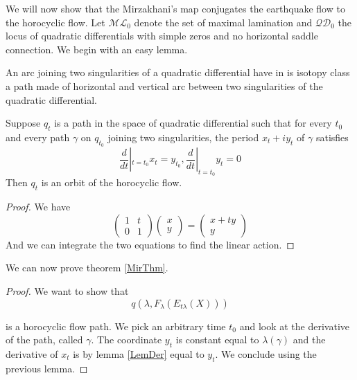 We will now show that the Mirzakhani's map conjugates the earthquake flow to the horocyclic flow. Let $\mathcal{ML}_0$ denote the set of maximal lamination and $\mathcal{QD}_0$ the locus of quadratic differentials with simple zeros and no horizontal saddle connection. We begin with an easy lemma.

\begin{lem}
An arc joining two singularities of a quadratic differential have in is isotopy class a path made of horizontal and vertical arc between two singularities of the quadratic differential.
\end{lem}

\begin{cor}
Suppose $q_t$ is a path in the space of quadratic differential such that for every $t_0$ and every path $\gamma$ on $q_{t_0}$ joining two singularities, the period $x_t + i y_t$ of $\gamma$ satisfies \[
\frac{d}{dt}|_{t=t_0} x_t = y_{t_0}, \frac{d}{dt}|_{t=t_0} y_t = 0
\]
Then $q_t$ is an orbit of the horocyclic flow.
\end{cor}

\begin{proof}
We have \[
\begin{pmatrix} 1 & t \\ 0 & 1 \end{pmatrix} \begin{pmatrix} x \\ y \end{pmatrix} = \begin{pmatrix} x + t y \\ y \end{pmatrix}
\]
And we can integrate the two equations to find the linear action.
\end{proof}

We can now prove theorem \ref{MirThm}.

\begin{proof}
We want to show that \[
q(\lambda,F_{\lambda}(E_{t \lambda}(X)))
\]

is a horocyclic flow path. We pick an arbitrary time $t_0$ and look at the derivative of the path, called $\gamma$. The coordinate $y_t$ is constant equal to $\lambda(\gamma)$ and the derivative of $x_t$ is by lemma \ref{LemDer} equal to $y_t$. We conclude using the previous lemma.
\end{proof}
